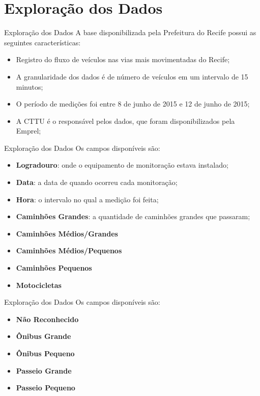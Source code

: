 \section{Exploração dos Dados}

\begin{frame}{Exploração dos Dados}
A base disponibilizada pela Prefeitura do Recife possui as seguintes
características:
\begin{itemize}
	\item Registro do fluxo de veículos nas vias mais movimentadas do Recife;
	\item A granularidade dos dados é de número de veículos em um intervalo
	de 15 minutos;
	\item O período de medições foi entre 8 de junho de 2015 e 12 de junho
	de 2015;
	\item A CTTU é o responsável pelos dados, que foram disponibilizados
	pela Emprel;
\end{itemize}
\end{frame}

\begin{frame}{Exploração dos Dados}
Os campos disponíveis são:
\begin{itemize}
	\item \textbf{Logradouro}: onde o equipamento de monitoração estava
	instalado;
	\item \textbf{Data}: a data de quando ocorreu cada monitoração;
	\item \textbf{Hora}: o intervalo no qual a medição foi feita;
	\item \textbf{Caminhões Grandes}: a quantidade de caminhões grandes que
	passaram;
	\item \textbf{Caminhões Médios/Grandes}
	\item \textbf{Caminhões Médios/Pequenos}
	\item \textbf{Caminhões Pequenos}
	\item \textbf{Motocicletas}
\end{itemize}
\end{frame}

\begin{frame}{Exploração dos Dados}
Os campos disponíveis são:
\begin{itemize}
	\item \textbf{Não Reconhecido}
	\item \textbf{Ônibus Grande}
	\item \textbf{Ônibus Pequeno}
	\item \textbf{Passeio Grande}
	\item \textbf{Passeio Pequeno}
\end{itemize}
\end{frame}

